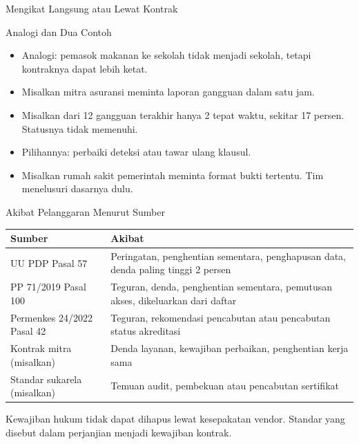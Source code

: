 \documentclass[aspectratio=169, table, 12pt]{beamer}
\begin{document}
\begin{frame}{{\Large Mengikat Langsung atau Lewat Kontrak}}
  \centering
  \resizebox{0.95\textwidth}{!}{}
\end{frame}

\begin{frame}{{\Large Analogi dan Dua Contoh}}
  \vspace{4pt}
  \small
  \begin{itemize}
    \item Analogi: pemasok makanan ke sekolah tidak menjadi sekolah, tetapi kontraknya dapat lebih ketat.
    \item Misalkan mitra asuransi meminta laporan gangguan dalam satu jam.
    \item Misalkan dari 12 gangguan terakhir hanya 2 tepat waktu, sekitar 17 persen. Statusnya tidak memenuhi.
    \item Pilihannya: perbaiki deteksi atau tawar ulang klausul.
    \item Misalkan rumah sakit pemerintah meminta format bukti tertentu. Tim menelusuri dasarnya dulu.
  \end{itemize}
\end{frame}

\begin{frame}{{\Large Akibat Pelanggaran Menurut Sumber}}
  \vspace{2pt}
  \footnotesize
  \begin{tabularx}{\textwidth}{|>{\raggedright\arraybackslash}p{}|>{\raggedright\arraybackslash}X|}
    \hline
    \textbf{Sumber} & \textbf{Akibat} \\ \hline
    UU PDP Pasal 57 & Peringatan, penghentian sementara, penghapusan data, denda paling tinggi 2 persen \\ \hline
    PP 71/2019 Pasal 100 & Teguran, denda, penghentian sementara, pemutusan akses, dikeluarkan dari daftar \\ \hline
    Permenkes 24/2022 Pasal 42 & Teguran, rekomendasi pencabutan atau pencabutan status akreditasi \\ \hline
    Kontrak mitra (misalkan) & Denda layanan, kewajiban perbaikan, penghentian kerja sama \\ \hline
    Standar sukarela (misalkan) & Temuan audit, pembekuan atau pencabutan sertifikat \\ \hline
  \end{tabularx}

  \vspace{6pt}
  \small Kewajiban hukum tidak dapat dihapus lewat kesepakatan vendor. Standar yang disebut dalam perjanjian
  menjadi kewajiban kontrak.
\end{frame}
\end{document}
